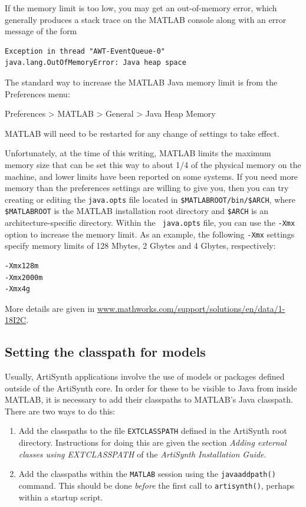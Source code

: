 \documentclass{article}
\begin{document}
If the memory limit is too low, you may get an out-of-memory error,
which generally produces a stack trace on the MATLAB console along
with an error message of the form
%
\begin{lstlisting}[]
Exception in thread "AWT-EventQueue-0"
java.lang.OutOfMemoryError: Java heap space
\end{lstlisting}
%

The standard way to increase the MATLAB Java memory limit is from the
{\sf Preferences} menu:

{\sf Preferences > MATLAB > General > Java Heap Memory}

MATLAB will need to be restarted for any change of settings to take
effect.

Unfortunately, at the time of this writing, MATLAB limits the maximum
memory size that can be set this way to about 1/4 of the physical
memory on the machine, and lower limits have been reported on some
systems. If you need more memory than the preferences
settings are willing to give you, then you can try creating or editing
the {\tt java.opts} file located in {\tt \$MATLABROOT/bin/\$ARCH},
where {\tt \$MATLABROOT} is the MATLAB installation root directory and
{\tt \$ARCH} is an architecture-specific directory. Within the {\tt
java.opts} file, you can use the {\tt -Xmx} option to increase the
memory limit. As an example, the following {\tt -Xmx} settings
specify memory limits of 128 Mbytes, 2 Gbytes and 4 Gbytes,
respectively:
%
\begin{lstlisting}[]
-Xmx128m 
-Xmx2000m
-Xmx4g
\end{lstlisting}
%
More details are given in
\href{http://www.mathworks.com/support/solutions/en/data/1-18I2C}
{www.mathworks.com/support/solutions/en/data/1-18I2C}.

\subsection{Setting the classpath for  models}
\label{ModelClasspath:sec}

Usually, ArtiSynth applications involve the use of models or packages
defined outside of the ArtiSynth core. In order for these to be
visible to Java from inside MATLAB, it is necessary to add their
classpaths to MATLAB's Java classpath. There are two ways to do this:

\begin{enumerate}

\item Add the classpaths to the file {\tt EXTCLASSPATH} defined in the
ArtiSynth root directory. Instructions for doing this are given the
section {\it Adding external classes using EXTCLASSPATH} of the {\it
ArtiSynth Installation Guide}.

\item Add the classpaths within the {\tt MATLAB} session using the
{\tt javaaddpath()} command. This should be done {\it before} the
first call to {\tt artisynth()}, perhaps within a startup script.

\end{enumerate}
\end{document}
